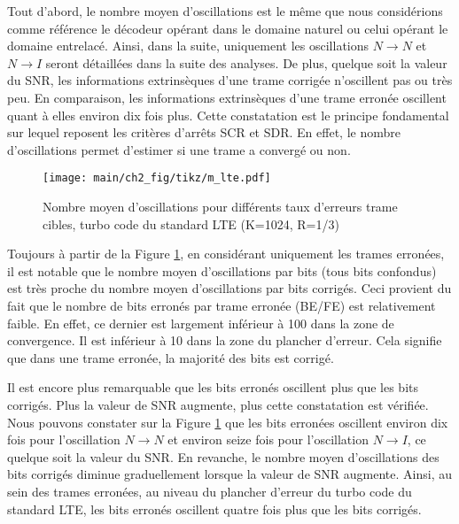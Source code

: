 Tout d'abord, le nombre moyen d'oscillations est le même que nous considérions comme référence le décodeur opérant dans le 
domaine naturel ou celui opérant le domaine entrelacé. Ainsi, dans la suite, uniquement les oscillations $N\rightarrow N$ 
et $N\rightarrow I$ seront détaillées dans la suite des analyses.
De plus, quelque soit la valeur du SNR, les informations extrinsèques d'une trame corrigée n'oscillent pas ou très 
peu. En comparaison, les informations extrinsèques d'une trame erronée oscillent quant à elles environ dix fois plus.
Cette constatation est le principe fondamental sur lequel reposent les critères d'arrêts SCR et SDR. En effet, le nombre 
d'oscillations permet d'estimer si une trame a convergé ou non.

\begin{figure}[tb]
	\begin{center}
	\texttt{[image: main/ch2\_fig/tikz/m\_lte.pdf]}
	\caption{Nombre moyen d'oscillations pour différents taux d'erreurs trame cibles, turbo code du standard LTE (K=1024, R=1/3) \label{ch2:fig:meanlte}}
	\end{center}
\end{figure}

Toujours à partir de la Figure \ref{ch2:fig:meanlte}, en considérant uniquement les trames erronées, il est notable que le nombre moyen 
d’oscillations par bits (tous bits confondus) est très proche du nombre moyen d’oscillations par bits corrigés. Ceci 
provient du fait que le nombre de bits erronés par trame erronée (BE/FE) est relativement faible. En effet, ce dernier 
est largement inférieur à 100 dans la zone de convergence. Il est inférieur à 10 dans la zone du plancher d'erreur. Cela
signifie que dans une trame erronée, la majorité des bits est corrigé. 

Il est encore plus remarquable que les bits erronés oscillent plus que les bits corrigés. Plus la valeur de SNR augmente, 
plus cette constatation est vérifiée. Nous pouvons constater sur la Figure \ref{ch2:fig:meanlte} que les bits erronées 
oscillent environ dix fois pour l'oscillation $N\rightarrow N$ et environ seize fois pour 
l'oscillation $N\rightarrow I$, ce quelque soit la valeur du SNR. En revanche, le nombre moyen d'oscillations des bits corrigés 
diminue graduellement lorsque la valeur de SNR augmente. Ainsi, au sein des trames erronées, au niveau du plancher d'erreur 
du turbo code du standard LTE, les bits erronés oscillent quatre fois plus que les bits corrigés.

